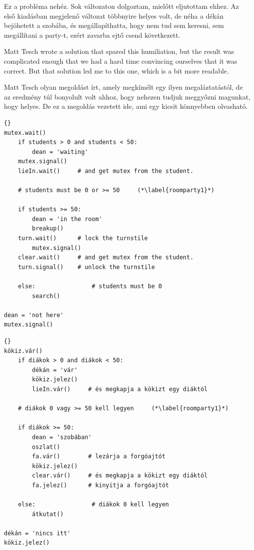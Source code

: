 \documentclass{book}
\begin{document}
Ez a probléma nehéz. Sok változaton dolgoztam, mielőtt eljutottam ehhez. Az első kiadásban
megjelenő változat többnyire helyes volt, de néha a dékán bejöhetett a szobába, és
megállapíthatta, hogy nem tud sem keresni, sem megállítani a party-t, ezért zavarba ejtő
csend következett.

Matt Tesch wrote a solution that spared this humiliation, but the
result was complicated enough that we had a hard time convincing
ourselves that it was correct.  But that solution led me to this one,
which is a bit more readable.

Matt Tesch olyan megoldást írt, amely megkímélt egy ilyen megaláztatástól, de az eredmény
túl bonyolult volt ahhoz, hogy nehezen tudjuk meggyőzni magunkat, hogy helyes. De ez a
megoldás vezetett ide, ami egy kicsit könnyebben olvasható.

\begin{lstlisting}[title={Room party solution (dean)}]{}
mutex.wait()
    if students > 0 and students < 50:
        dean = 'waiting'
	mutex.signal()
	lieIn.wait()     # and get mutex from the student.

    # students must be 0 or >= 50     (*\label{roomparty1}*)

    if students >= 50:
        dean = 'in the room'
        breakup()
	turn.wait()      # lock the turnstile
        mutex.signal()
	clear.wait()     # and get mutex from the student.
	turn.signal()    # unlock the turnstile

    else:                # students must be 0
        search()

dean = 'not here'
mutex.signal() 
\end{lstlisting}

\begin{lstlisting}[title={Szobabuli megoldás (dékán)}]{}
kökiz.vár()
    if diákok > 0 and diákok < 50:
        dékán = 'vár'
        kökiz.jelez()
        lieIn.vár()     # és megkapja a kökizt egy diáktól

    # diákok 0 vagy >= 50 kell legyen     (*\label{roomparty1}*)

    if diákok >= 50:
        dean = 'szobában'
        oszlat()
        fa.vár()        # lezárja a forgóajtót
        kökiz.jelez()
        clear.vár()     # és megkapja a kökizt egy diáktól
        fa.jelez()      # kinyitja a forgóajtót

    else:                # diákok 0 kell legyen 
        átkutat()

dékán = 'nincs itt'
kökiz.jelez() 
\end{lstlisting}
\end{document}
